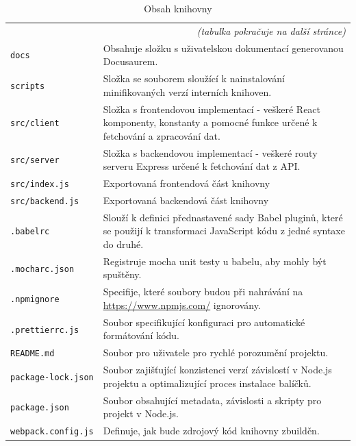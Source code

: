 \documentclass[czech, bc, kiv, he, iso690numb]{fasthesis}
\begin{document}
\begin{center}
	\begin{longtable}{p{}p{}}
	\caption{Obsah knihovny}
	\label{tab:dirLibrary}\\
	\toprule[1.5pt]
	\endhead
	\midrule
	\multicolumn{2}{r}{\textit{(tabulka pokračuje na další stránce)}}\\
	\endfoot
	\bottomrule[1.5pt]
	\endlastfoot
	\verb"docs" & Obsahuje složku s uživatelskou dokumentací generovanou Docusaurem. \\
	\midrule
	\verb"scripts" & Složka se souborem sloužící k nainstalování minifikovaných verzí interních knihoven. \\
	\midrule
	\verb"src/client" & Složka s frontendovou implementací - veškeré React komponenty, konstanty a pomocné funkce určené k fetchování a zpracování dat.  \\
	\midrule
	\verb"src/server" & Složka s backendovou implementací - veškeré routy serveru Express určené k fetchování dat z API.  \\
	\midrule
	\verb"src/index.js" & Exportovaná frontendová část knihovny \\
	\midrule
	\verb"src/backend.js" & Exportovaná backendová část knihovny \\
	\midrule
	\verb".babelrc" & Slouží k definici přednastavené sady Babel pluginů, které se použijí k transformaci JavaScript kódu z jedné syntaxe do druhé.  \\
	\midrule
	\verb".mocharc.json" & Registruje mocha unit testy u babelu, aby mohly být spuštěny.  \\
	\midrule
	\verb".npmignore" & Specifije, které soubory budou při nahrávání na \url{https://www.npmjs.com/} ignorovány. \\
	\midrule
	\verb".prettierrc.js" & Soubor specifikující konfiguraci pro automatické formátování kódu. \\
	\midrule
	\verb"README.md" & Soubor pro uživatele pro rychlé porozumění projektu.  \\
	\midrule
	\verb"package-lock.json" & Soubor zajišťující konzistenci verzí závislostí v Node.js projektu a optimalizující proces instalace balíčků.  \\
	\midrule
	\verb"package.json" & Soubor obsahující metadata, závislosti a skripty pro projekt v Node.js. \\
	\midrule
	\verb"webpack.config.js" & Definuje, jak bude zdrojový kód knihovny zbuilděn.  \\
	\end{longtable}
\end{center}
\end{document}
